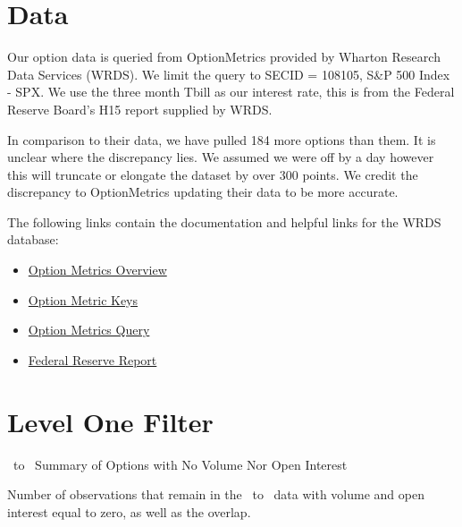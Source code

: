 \begin{appendix}


\section{Data}\label{app:data}

Our option data is queried from OptionMetrics provided by Wharton Research Data Services (WRDS). We limit the query to SECID = 108105, S\&P 500 Index - SPX. We use the three month Tbill as our interest rate, this is from the Federal Reserve Board's H15 report supplied by WRDS. 

In comparison to their data, we have pulled 184 more options than them. It is unclear where the discrepancy lies. We assumed we were off by a day however this will truncate or elongate the dataset by over 300 points. We credit the discrepancy to OptionMetrics updating their data to be more accurate. 

The following links contain the documentation and helpful links for the WRDS database: 
\begin{itemize}
\item \href{https://wrds-www.wharton.upenn.edu/pages/support/manuals-and-overviews/optionmetrics/wrds-overview-optionmetrics/}{Option Metrics Overview} 
\item \href{https://wrds-www.wharton.upenn.edu/data-dictionary/optionm_all/opprcd2023/ }{Option Metric Keys}
\item \href{https://wrds-www.wharton.upenn.edu/pages/get-data/optionmetrics/ivy-db-us/options/option-prices/}{Option Metrics Query} 
\item \href{https://wrds-www.wharton.upenn.edu/data-dictionary/frb_all/rates_daily/}{Federal Reserve Report} 
\end{itemize}



\newpage

\section{Level One Filter}\label{app:lvl1}


\begin{table}[ht]

\centering
{}
\caption{\STARTONE\ to \ENDONE\ Summary of Options with No Volume Nor Open Interest}



\caption*{
  Number of observations that remain in the \STARTONE\ to \ENDONE\ data with volume and open interest equal to zero, as well as the overlap. 
}
\label{table:time1lvl1T1}
\end{table}



\end{appendix}
